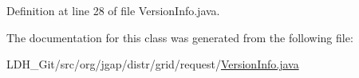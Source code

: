 Definition at line 28 of file Version\-Info.\-java.



The documentation for this class was generated from the following file\-:\begin{DoxyCompactItemize}
\item 
L\-D\-H\-\_\-\-Git/src/org/jgap/distr/grid/request/\hyperlink{_version_info_8java}{Version\-Info.\-java}\end{DoxyCompactItemize}
